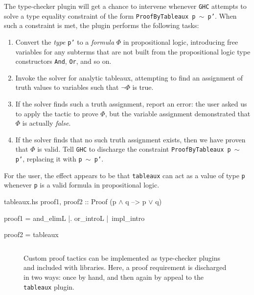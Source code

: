 \documentclass[format=sigplan, review=false, screen=true]{acmart}
\begin{document}
The type-checker plugin will get a chance to intervene whenever \texttt{GHC}
attempts to solve a type equality constraint of the form \texttt{ProofByTableaux p $\sim$ p'}.
When such a constraint is met, the plugin performs the following tasks:
\begin{enumerate}
\item Convert the \emph{type} \texttt{p'} to a \emph{formula} $\Phi$ in propositional
  logic, introducing free variables for any subterms that are not built from the
  propositional logic type constructors \texttt{And}, \texttt{Or}, and so on.
\item Invoke the solver for analytic tableaux, attempting to find an assignment of truth
  values to variables such that $\neg \Phi$ is true.
\item If the solver finds such a truth assignment, report an error: the user asked us
  to apply the tactic to prove $\Phi$, but the variable assignment demonstrated that
  $\Phi$ is actually \emph{false}.
\item If the solver finds that no such truth assignment exists, then we have proven that
  $\Phi$ is valid. Tell \texttt{GHC} to discharge the constraint \texttt{ProofByTableaux p $\sim$ p'}, replacing it with \texttt{p $\sim$ p'}.
\end{enumerate}
For the user, the effect appears to be that \texttt{tableaux} can act as a value of
type \texttt{p} whenever \texttt{p} is a valid formula in propositional logic.

\begin{filecontents*}{tableaux.hs}
proof1, proof2 :: Proof (p {$\wedge$} q --> p {$\vee$} q)
  
proof1 =  and_elimL
       |. or_introL
       |\ impl_intro

proof2 = tableaux
\end{filecontents*}

\begin{figure}
  \inputminted{haskell}{tableaux.hs}
  \caption{Custom proof tactics can be implemented as type-checker plugins and
    included with libraries. Here, a proof requirement is discharged in two ways:
    once by hand, and then again by appeal to the \texttt{tableaux} plugin.
    \label{tableaux-example}}
\end{figure}


  
\end{document}
